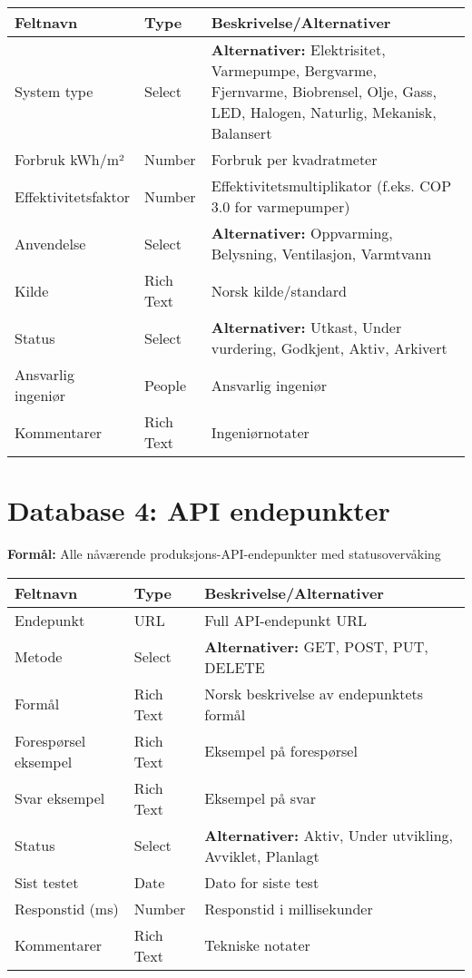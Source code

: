 \documentclass[11pt,a4paper]{article}
\begin{document}
\begin{longtable}{@{}p{4cm}p{2.5cm}p{8cm}@{}}
\toprule
\textbf{Feltnavn} & \textbf{Type} & \textbf{Beskrivelse/Alternativer} \\
\midrule
System type & Select & \textbf{Alternativer:} Elektrisitet, Varmepumpe, Bergvarme, Fjernvarme, Biobrensel, Olje, Gass, LED, Halogen, Naturlig, Mekanisk, Balansert \\
\addlinespace
Forbruk kWh/m² & Number & Forbruk per kvadratmeter \\
\addlinespace
Effektivitetsfaktor & Number & Effektivitetsmultiplikator (f.eks. COP 3.0 for varmepumper) \\
\addlinespace
Anvendelse & Select & \textbf{Alternativer:} Oppvarming, Belysning, Ventilasjon, Varmtvann \\
\addlinespace
Kilde & Rich Text & Norsk kilde/standard \\
\addlinespace
Status & Select & \textbf{Alternativer:} Utkast, Under vurdering, Godkjent, Aktiv, Arkivert \\
\addlinespace
Ansvarlig ingeniør & People & Ansvarlig ingeniør \\
\addlinespace
Kommentarer & Rich Text & Ingeniørnotater \\
\bottomrule
\end{longtable}

\section{Database 4: API endepunkter}

\textbf{Formål:} Alle nåværende produksjons-API-endepunkter med statusovervåking

\begin{longtable}{@{}p{4cm}p{2.5cm}p{8cm}@{}}
\toprule
\textbf{Feltnavn} & \textbf{Type} & \textbf{Beskrivelse/Alternativer} \\
\midrule
Endepunkt & URL & Full API-endepunkt URL \\
\addlinespace
Metode & Select & \textbf{Alternativer:} GET, POST, PUT, DELETE \\
\addlinespace
Formål & Rich Text & Norsk beskrivelse av endepunktets formål \\
\addlinespace
Forespørsel eksempel & Rich Text & Eksempel på forespørsel \\
\addlinespace
Svar eksempel & Rich Text & Eksempel på svar \\
\addlinespace
Status & Select & \textbf{Alternativer:} Aktiv, Under utvikling, Avviklet, Planlagt \\
\addlinespace
Sist testet & Date & Dato for siste test \\
\addlinespace
Responstid (ms) & Number & Responstid i millisekunder \\
\addlinespace
Kommentarer & Rich Text & Tekniske notater \\
\bottomrule
\end{longtable}
\end{document}
